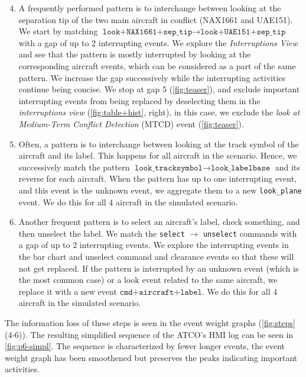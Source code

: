 \documentclass[camera]{vgtc}                          %
\begin{document}
\begin{enumerate}
\setcounter{enumi}{3}
    \itemsep0em
    \vspace{-4pt}
    \item A frequently performed pattern is to interchange between looking at the separation tip of the two main aircraft in conflict (NAX1661 and UAE151). We start by matching $\texttt{look+NAX1661+sep\_tip} \rightarrow \texttt{look+UAE151+sep\_tip}$ with a gap of up to 2 interrupting events. We explore the \textit{Interruptions View} and see that the pattern is mostly interrupted by looking at the corresponding aircraft events, which can be considered as a part of the same pattern. We increase the gap successively while the interrupting activities continue being concise. We stop at gap 5 (\autoref{fig:teaser}), and exclude important interrupting events from being replaced by deselecting them in the \textit{interruptions view} (\autoref{fig:table+hist}, right), in this case, we exclude the \textit{look at Medium-Term Conflict Detection} (MTCD) event (\autoref{fig:teaser}).
    
    \vspace{-4pt}
    \item Often, a pattern is to interchange between looking at the track symbol of the aircraft and its label. This happens for all aircraft in the scenario. Hence, we successively match the pattern $ \texttt{look\_tracksymbol} \rightarrow \texttt{look\_labelbase} $ and its reverse for each aircraft. When the pattern has up to one interrupting event, and this event is the unknown event, we aggregate them to a new \texttt{look\_plane} event. We do this for all 4 aircraft in the simulated scenario.  
    
    \vspace{-4pt}
    \item Another frequent pattern is to select an aircraft's label, check something, and then unselect the label. We match the \texttt{select} $\rightarrow$ \texttt{unselect} commands with a gap of up to 2 interrupting events. We explore the interrupting events in the bar chart and unselect command and clearance events so that these will not get replaced. If the pattern is interrupted by an unknown event (which is the most common case) or a look event related to the same aircraft, we replace it with a new event $ \texttt{cmd+aircraft+label} $. We do this for all 4 aircraft in the simulated scenario.  
\end{enumerate}
The information loss of these steps is seen in the event weight graphs (\autoref{fig:steps}(4-6)). The resulting simplified sequence of the ATCO's HMI log can be seen in \autoref{fig:p6-simpl}. The sequence is characterized by fewer longer events, the event weight graph has been smoothened but preserves the peaks indicating important activities.  
\end{document}
